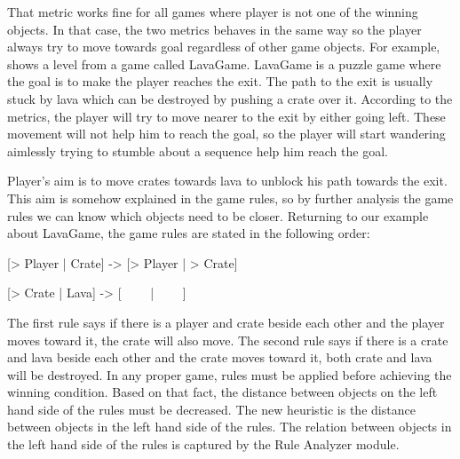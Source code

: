 \begin{hcfigure}
\begin{minipage}{0.45\textwidth}
  		\caption{Example of distance between player and winning objects metric}\label{Figure:bestFS2}
	\end{minipage}
\end{hcfigure}

That metric works fine for all games where player is not one of the winning objects. In that case, the two metrics behaves in the same way so the player always try to move towards goal regardless of other game objects. For example,  shows a level from a game called LavaGame. LavaGame is a puzzle game where the goal is to make the player reaches the exit. The path to the exit is usually stuck by lava which can be destroyed by pushing a crate over it. According to the metrics, the player will try to move nearer to the exit by either going left. These movement will not help him to reach the goal, so the player will start wandering aimlessly trying to stumble about a sequence help him reach the goal.


Player's aim is to move crates towards lava to unblock his path towards the exit. This aim is somehow explained in the game rules, so by further analysis the game rules we can know which objects need to be closer. Returning to our example about LavaGame, the game rules are stated in the following order:
\begin{center}{[> Player | Crate] -> [> Player | > Crate]}\end{center}
\begin{center}{[> Crate | Lava] -> [ \ \ \ \ | \ \ \ \ ]}\end{center}
The first rule says if there is a player and crate beside each other and the player moves toward it, the crate will also move. The second rule says if there is a crate and lava beside each other and the crate moves toward it, both crate and lava will be destroyed. In any proper game, rules must be applied before achieving the winning condition. Based on that fact, the distance between objects on the left hand side of the rules must be decreased. The new heuristic is the distance between objects in the left hand side of the rules. The relation between objects in the left hand side of the rules is captured by the Rule Analyzer module.\\\par

